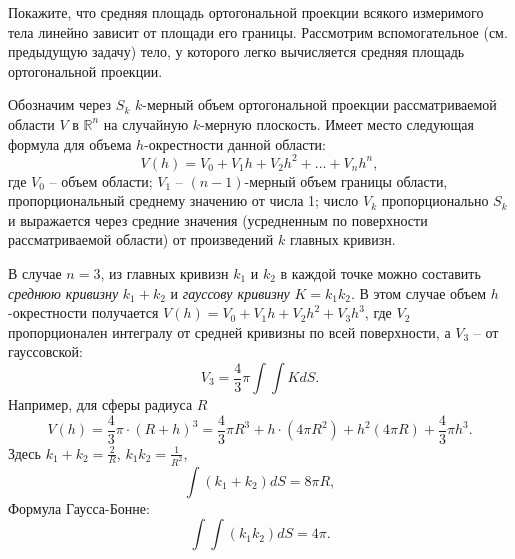 \begin{ordre}
Покажите, что  средняя площадь  ортогональной проекции всякого измеримого тела 
линейно зависит от площади его границы. 
Рассмотрим вспомогательное (см. предыдущую задачу) тело, у которого легко вычисляется средняя площадь ортогональной проекции. 
\end{ordre}

\begin{remark}
Обозначим через $S_k$ $k$-мерный объем ортогональной 
проекции рассматриваемой области $V$ в ${\mathbb R}^n$ на случайную $k$-мерную 
плоскость. Имеет место следующая формула для объема $h$-окрестности данной области:
\[
V\left( h \right)=V_0 +V_1 h+V_2 h^2+...+V_n h^n,
\]
где $V_0 $ -- объем области; $V_1 $ -- $(n-1)$-мерный объем границы области, 
пропорциональный среднему значению от числа 1; число $V_k $ пропорционально 
$S_k $ и выражается через средние значения (усредненным по поверхности рассматриваемой области)  от произведений $k$ главных 
кривизн. 

В случае $n = 3$, из главных кривизн $k_1 $ и $k_2 $ в каждой точке 
можно составить \textit{среднюю кривизну} $k_1 +k_2 $ и \textit{гауссову кривизну} $K=k_1 k_2 $. В этом случае объем 
$h$-окрестности получается $V\left( h \right)=V_0 +V_1 h+V_2 h^2+V_3 h^3$, где 
$V_2 $ пропорционален интегралу от средней кривизны по всей поверхности, а $V_3 $ -- от гауссовской:
\[
V_3 =\frac{4}{3}\pi \int\!\!\!\int {KdS} .
\]
Например, для сферы радиуса $R$
\[
V\left( h \right)=\frac{4}{3}\pi \cdot \left( {R+h} \right)^3=\frac{4}{3}\pi 
R^3+h\cdot \left( {4\pi R^2} \right)+h^2\left( {4\pi R} 
\right)+\frac{4}{3}\pi h^3.
\]
Здесь $k_1 + k_2 = \frac{2}{R}$, $k_1 k_2 = \frac{1}{R^2}$,
\[
\int  (k_1 +k_2)   dS = 8\pi R,
\]
Формула Гаусса-Бонне:
 \[\int\!\!\!\int {\left( {k_1 k_2 } \right)dS} =4\pi. \] 


\end{remark}


